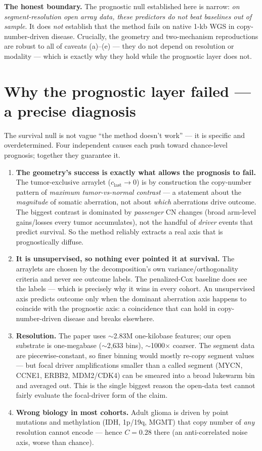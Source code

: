 \documentclass[11pt]{article}
\newcommand{\C}{\textit{C}}
\begin{document}
\textbf{The honest boundary.} The prognostic null established here is narrow:
\emph{on segment-resolution open array data, these predictors do not beat baselines
out of sample}. It does \emph{not} establish that the method fails on native 1-kb
WGS in copy-number-driven disease. Crucially, the geometry and two-mechanism
reproductions are robust to all of caveats (a)--(e) --- they do not depend on
resolution or modality --- which is exactly why they hold while the prognostic
layer does not.

\section{Why the prognostic layer failed --- a precise diagnosis}
\label{sec:whyfail}
The survival null is not vague ``the method doesn't work'' --- it is specific and
overdetermined. Four independent causes each push toward chance-level prognosis;
together they guarantee it.

\begin{enumerate}[leftmargin=1.6em]
  \item \textbf{The geometry's success is exactly what allows the prognosis to
  fail.} The tumor-exclusive arraylet ($c_{\text{last}}\!\to\!0$) is by
  construction the copy-number pattern of \emph{maximum tumor-vs-normal contrast}
  --- a statement about the \emph{magnitude} of somatic aberration, not about
  \emph{which} aberrations drive outcome. The biggest contrast is dominated by
  \emph{passenger} CN changes (broad arm-level gains/losses every tumor
  accumulates), not the handful of \emph{driver} events that predict survival. So
  the method reliably extracts a real axis that is prognostically diffuse.
  \item \textbf{It is unsupervised, so nothing ever pointed it at survival.} The
  arraylets are chosen by the decomposition's own variance/orthogonality criteria
  and never see outcome labels. The penalized-Cox baseline does see the labels ---
  which is precisely why it wins in every cohort. An unsupervised axis predicts
  outcome only when the dominant aberration axis happens to coincide with the
  prognostic axis: a coincidence that can hold in copy-number-driven disease and
  breaks elsewhere.
  \item \textbf{Resolution.} The paper uses $\sim$2.83M one-kilobase features; our
  open substrate is one-megabase ($\sim$2{,}633 bins), $\sim$1000$\times$ coarser.
  The segment data are piecewise-constant, so finer binning would mostly re-copy
  segment values --- but focal driver amplifications smaller than a called segment
  (MYCN, CCNE1, ERBB2, MDM2/CDK4) can be smeared into a broad lukewarm bin and
  averaged out. This is the single biggest reason the open-data test cannot fairly
  evaluate the focal-driver form of the claim.
  \item \textbf{Wrong biology in most cohorts.} Adult glioma is driven by point
  mutations and methylation (IDH, 1p/19q, MGMT) that copy number of \emph{any}
  resolution cannot encode --- hence $\C=0.28$ there (an anti-correlated noise
  axis, worse than chance).
\end{enumerate}
\end{document}
